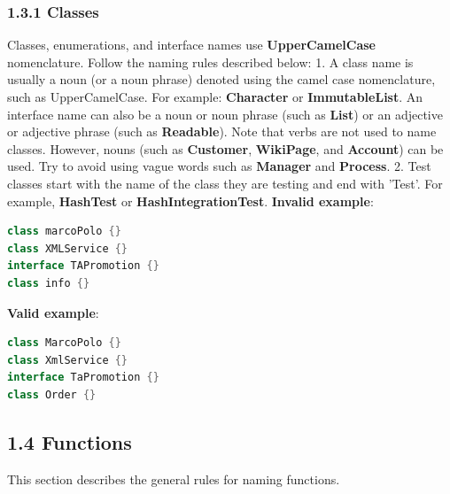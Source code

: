 \subsubsection*{\textbf{1.3.1 Classes}}
\leavevmode\newline
\label{sec:1.3.1}
Classes, enumerations, and interface names use \textbf{UpperCamelCase} nomenclature. Follow the naming rules described below:
1.	A class name is usually a noun (or a noun phrase) denoted using the camel case nomenclature, such as UpperCamelCase. For example: \textbf{Character} or \textbf{ImmutableList}.
An interface name can also be a noun or noun phrase (such as \textbf{List}) or an adjective or adjective phrase (such as \textbf{Readable}).
Note that verbs are not used to name classes. However, nouns (such as \textbf{Customer}, \textbf{WikiPage}, and \textbf{Account}) can be used. Try to avoid using vague words such as \textbf{Manager} and \textbf{Process}.
2.	Test classes start with the name of the class they are testing and end with 'Test'. For example, \textbf{HashTest} or \textbf{HashIntegrationTest}.
\textbf{Invalid example}:
\begin{lstlisting}[language=Kotlin]
class marcoPolo {}
class XMLService {}
interface TAPromotion {}
class info {}
\end{lstlisting}
\textbf{Valid example}:
\begin{lstlisting}[language=Kotlin]
class MarcoPolo {}
class XmlService {}
interface TaPromotion {}
class Order {}
\end{lstlisting}
\subsection*{\textbf{1.4 Functions}}
\label{sec:1.4}
This section describes the general rules for naming functions.
